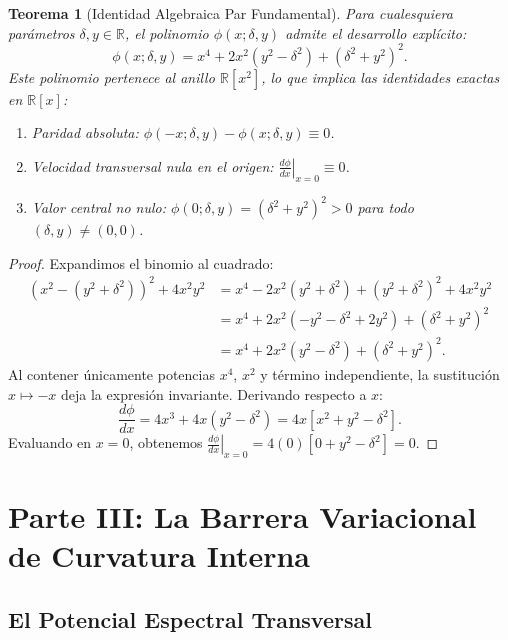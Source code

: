 \documentclass[11pt,a4paper]{article}
\newtheorem{theorem}{Teorema}[section]
\theoremstyle{definition}
\theoremstyle{remark}
\begin{document}
\begin{theorem}[Identidad Algebraica Par Fundamental]
Para cualesquiera parámetros $\delta, y \in \mathbb{R}$, el polinomio $\phi(x; \delta, y)$ admite el desarrollo explícito:
\begin{equation}
\phi(x; \delta, y) = x^4 + 2x^2(y^2 - \delta^2) + (\delta^2 + y^2)^2.
\end{equation}
Este polinomio pertenece al anillo $\mathbb{R}[x^2]$, lo que implica las identidades exactas en $\mathbb{R}[x]$:
\begin{enumerate}
    \item Paridad absoluta: $\phi(-x; \delta, y) - \phi(x; \delta, y) \equiv 0$.
    \item Velocidad transversal nula en el origen: $\left. \frac{d\phi}{dx} \right|_{x=0} \equiv 0$.
    \item Valor central no nulo: $\phi(0; \delta, y) = (\delta^2 + y^2)^2 > 0$ para todo $(\delta, y) \neq (0, 0)$.
\end{enumerate}
\end{theorem}

\begin{proof}
Expandimos el binomio al cuadrado:
\begin{align}
(x^2 - (y^2 + \delta^2))^2 + 4x^2y^2 &= x^4 - 2x^2(y^2 + \delta^2) + (y^2 + \delta^2)^2 + 4x^2y^2 \nonumber \\
&= x^4 + 2x^2(-y^2 - \delta^2 + 2y^2) + (\delta^2 + y^2)^2 \nonumber \\
&= x^4 + 2x^2(y^2 - \delta^2) + (\delta^2 + y^2)^2.
\end{align}
Al contener únicamente potencias $x^4$, $x^2$ y término independiente, la sustitución $x \mapsto -x$ deja la expresión invariante. Derivando respecto a $x$:
\begin{equation}
\frac{d\phi}{dx} = 4x^3 + 4x(y^2 - \delta^2) = 4x [x^2 + y^2 - \delta^2].
\end{equation}
Evaluando en $x = 0$, obtenemos $\left. \frac{d\phi}{dx} \right|_{x=0} = 4(0)[0 + y^2 - \delta^2] = 0$.
\end{proof}

\section{Parte III: La Barrera Variacional de Curvatura Interna}

\subsection{El Potencial Espectral Transversal}
\end{document}
